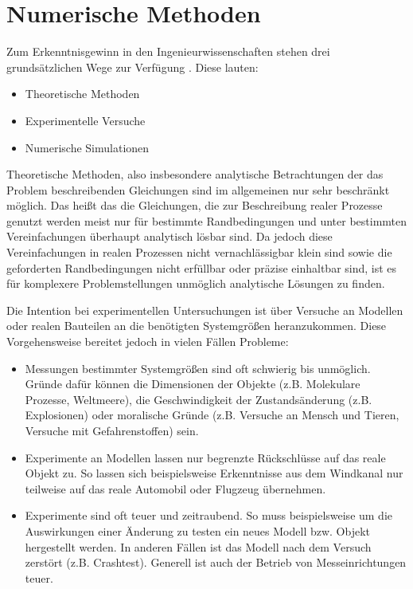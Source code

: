 \section{Numerische Methoden}

Zum Erkenntnisgewinn in den Ingenieurwissenschaften stehen drei grundsätzlichen
Wege zur Verfügung \cite{num_maschbau}. Diese lauten:
\begin{itemize}
  \item Theoretische Methoden
  \item Experimentelle Versuche
  \item Numerische Simulationen
\end{itemize}

Theoretische Methoden, also insbesondere analytische Betrachtungen der das Problem
beschreibenden Gleichungen sind im allgemeinen nur sehr beschränkt möglich. Das heißt das
die Gleichungen, die zur Beschreibung realer Prozesse genutzt werden meist nur für
bestimmte Randbedingungen und unter bestimmten Vereinfachungen überhaupt analytisch lösbar
sind. Da jedoch diese Vereinfachungen in realen Prozessen nicht vernachlässigbar klein sind
sowie die geforderten Randbedingungen nicht erfüllbar oder präzise einhaltbar sind, ist es
für komplexere Problemstellungen unmöglich analytische Lösungen zu finden.

Die Intention bei experimentellen Untersuchungen ist über Versuche an Modellen oder
realen Bauteilen an die benötigten Systemgrößen heranzukommen. Diese Vorgehensweise
bereitet jedoch in vielen Fällen Probleme:
\begin{itemize}
  \item Messungen bestimmter Systemgrößen sind oft schwierig bis unmöglich. Gründe
    dafür können die Dimensionen der Objekte (z.B. Molekulare Prozesse, Weltmeere),
    die Geschwindigkeit der Zustandsänderung (z.B. Explosionen) oder moralische Gründe
    (z.B. Versuche an Mensch und Tieren, Versuche mit Gefahrenstoffen) sein.
  \item Experimente an Modellen lassen nur begrenzte Rückschlüsse auf das reale Objekt
    zu. So lassen sich beispielsweise Erkenntnisse aus dem Windkanal nur teilweise auf
    das reale Automobil oder Flugzeug übernehmen.
  \item Experimente sind oft teuer und zeitraubend. So muss beispielsweise um die Auswirkungen
    einer Änderung zu testen ein neues Modell bzw. Objekt hergestellt werden. In anderen Fällen
    ist das Modell nach dem Versuch zerstört (z.B. Crashtest). Generell ist auch der Betrieb
    von Messeinrichtungen teuer.
\end{itemize}

